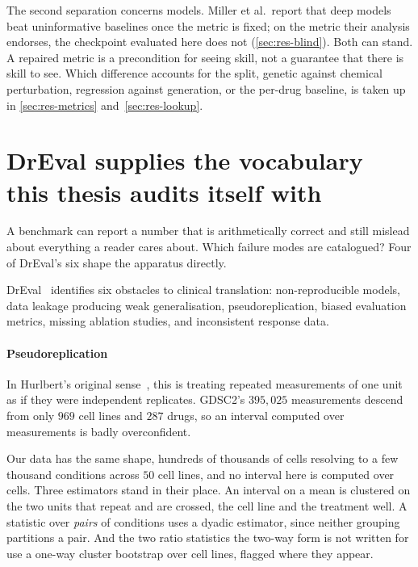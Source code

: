 The second separation concerns models. Miller et al.\ report that deep models
beat uninformative baselines once the metric is fixed; on the metric their
analysis endorses, the checkpoint evaluated here does not
(\cref{sec:res-blind}). Both can stand. A repaired metric is a precondition for
seeing skill, not a guarantee that there is skill to see. Which difference
accounts for the split, genetic against chemical perturbation, regression against
generation, or the per-drug baseline, is taken up in \cref{sec:res-metrics}
and~\cref{sec:res-lookup}.

\section{DrEval supplies the vocabulary this thesis audits itself with}
\label{sec:lit-dreval}
\framedecl{-}

\begin{question}
A benchmark can report a number that is arithmetically correct and still mislead
about everything a reader cares about. Which failure modes are catalogued? Four
of DrEval's six shape the apparatus directly.
\end{question}

\noindent
DrEval~\cite{dreval} identifies six obstacles to clinical translation:
non-reproducible models, data leakage producing weak generalisation,
pseudoreplication, biased evaluation metrics, missing ablation studies, and
inconsistent response data.

\paragraph{Pseudoreplication} In Hurlbert's original sense~\cite{hurlbert}, this
is treating repeated measurements of one unit as if they were independent
replicates. GDSC2's $395{,}025$ measurements descend from only $969$ cell lines
and $287$ drugs, so an interval computed over measurements is badly
overconfident.

Our data has the same shape, hundreds of thousands of cells resolving to a few
thousand conditions across $50$ cell lines, and no interval here is computed over
cells. Three estimators stand in their place. An interval on a mean is clustered
on the two units that repeat and are crossed, the cell line and the treatment
well. A statistic over \emph{pairs} of conditions uses a dyadic estimator, since
neither grouping partitions a pair. And the two ratio statistics the two-way form
is not written for use a one-way cluster bootstrap over cell lines, flagged where
they appear.

